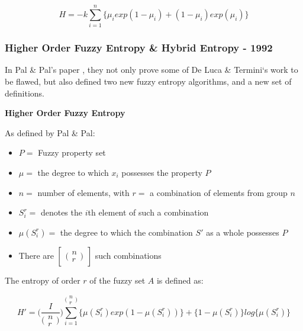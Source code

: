 \begin{equation} \label{eq:pal-pal-orig}
  H = -k  \displaystyle\sum_{i=1}^{n}{\{\mu_iexp(1 - \mu_i) + (1 - \mu_i)exp(\mu_i)\}}
\end{equation}

\subsubsection{Higher Order Fuzzy Entropy \& Hybrid Entropy - 1992}
\label{sssec:hybrid-section}

In Pal \& Pal's paper  \cite{Pal_Pal_1992}, they not only prove some of De Luca \& Termini`s work to be flawed, but also defined two new fuzzy entropy algorithms, and a new set of definitions.

\noindent \textbf{Higher Order Fuzzy Entropy}

\noindent As defined by Pal \& Pal:

\begin{itemize}
  \item $P = $ Fuzzy property set
  \item $\mu =$ the degree to which $x_i$ possesses the property $P$
  \item $n =$ number of elements, with $r =$ a combination of elements from group $n$
  \item $S^r_i =$ denotes the $i$th element of such a combination
  \item $\mu(S^r_i) =$ the degree to which the combination $S'$ as a whole possesses $P$
  \item There are $\begin{bmatrix} \bigl(\begin{smallmatrix}
  n \\ r
  \end{smallmatrix} \bigr) \end{bmatrix}$ such combinations
\end{itemize}

\noindent The entropy of order $r$ of the fuzzy set $A$ is defined as:

\begin{equation} \label{eq:higher-order}
  H' = \bigg(\frac{I}{\bigl(\begin{smallmatrix}
  n \\ r
\end{smallmatrix} \bigr)}\bigg) \displaystyle\sum_{i=1}^{\bigl(\begin{smallmatrix}
  n \\ r
  \end{smallmatrix} \bigr)} \{ \mu(S^r_i)exp(1 - \mu(S^r_i)) \} + \{ 1 - \mu(S^r_i) \}log\{\mu(S^r_i)\}
\end{equation}

